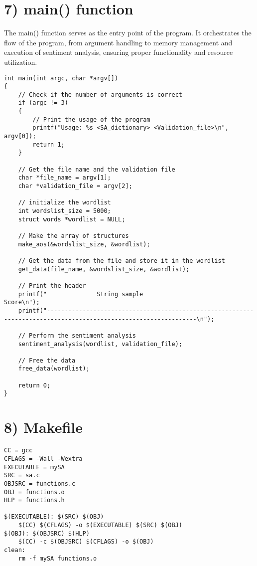 \documentclass[a4paper,11pt]{article}
\theoremstyle{mytheor}
\begin{document}
\section*{7) main() function}
The main() function serves as the entry point of the program. It orchestrates the flow of the program, from argument handling to memory management and execution of sentiment analysis, ensuring proper functionality and resource utilization.
\begin{lstlisting}[label={list:seventh},caption=main() function]
int main(int argc, char *argv[])
{   
    // Check if the number of arguments is correct
    if (argc != 3)
    {
        // Print the usage of the program
        printf("Usage: %s <SA_dictionary> <Validation_file>\n", argv[0]);
        return 1;
    }

    // Get the file name and the validation file
    char *file_name = argv[1];
    char *validation_file = argv[2];

    // initialize the wordlist
    int wordslist_size = 5000;
    struct words *wordlist = NULL;
    
    // Make the array of structures
    make_aos(&wordslist_size, &wordlist);

    // Get the data from the file and store it in the wordlist
    get_data(file_name, &wordslist_size, &wordlist);

    // Print the header
    printf("              String sample                                                                               Score\n");
    printf("----------------------------------------------------------------------------------------------------------------\n");

    // Perform the sentiment analysis
    sentiment_analysis(wordlist, validation_file);

    // Free the data
    free_data(wordlist);

    return 0;
}
\end{lstlisting}

\section*{8) Makefile}
\begin{lstlisting}[label={list:eighth},caption=Makefile]
CC = gcc
CFLAGS = -Wall -Wextra 
EXECUTABLE = mySA
SRC = sa.c
OBJSRC = functions.c
OBJ = functions.o
HLP = functions.h

$(EXECUTABLE): $(SRC) $(OBJ)
	$(CC) $(CFLAGS) -o $(EXECUTABLE) $(SRC) $(OBJ)
$(OBJ): $(OBJSRC) $(HLP)
	$(CC) -c $(OBJSRC) $(CFLAGS) -o $(OBJ) 
clean:
	rm -f mySA functions.o
\end{lstlisting}
\end{document}
